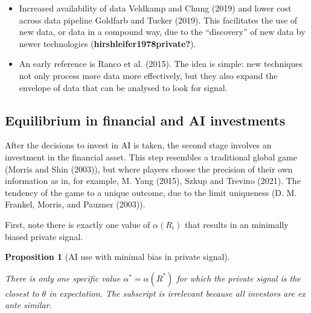 \documentclass[
]{article}
\theoremstyle{plain}
\newtheorem{proposition}{Proposition}[section]
\theoremstyle{remark}
\begin{document}
\begin{itemize}
\item
  Increased availability of data Veldkamp and Chung (2019) and lower
  cost across data pipeline Goldfarb and Tucker (2019). This facilitates
  the use of new data, or data in a compound way, due to the
  ``discovery'' of new data by newer technologies
  (\textbf{hirshleifer1978private?}).
\item
  An early reference is Ranco et al. (2015). The idea is simple: new
  techniques not only process more data more effectively, but they also
  expand the envelope of data that can be analysed to look for signal.
\end{itemize}

\subsection{Equilibrium in financial and AI
investments}\label{equilibrium-in-financial-and-ai-investments}

After the decisions to invest in AI is taken, the second stage involves
an investment in the financial asset. This step resembles a traditional
global game (Morris and Shin (2003)), but where players choose the
precision of their own information as in, for example, M. Yang (2015),
Szkup and Trevino (2021). The tendency of the game to a unique outcome,
due to the limit uniqueness (D. M. Frankel, Morris, and Pauzner (2003)).

First, note there is exactly one value of \(\alpha(R_i)\) that results
in an minimally biased private signal.

\begin{proposition}[AI use with minimal bias in private
signal]\protect\hypertarget{prp-alphainvestunbiased}{}\label{prp-alphainvestunbiased}

There is only one specific value \(\alpha^* = \alpha(R^*)\) for which
the private signal is the closest to \(\theta\) in expectation. The
subscript is irrelevant because all investors are ex ante similar.

\end{proposition}
\end{document}
